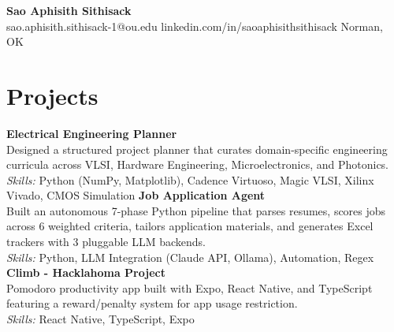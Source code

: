 \documentclass[11pt,letterpaper]{article}
\begin{document}
\begin{center}
{\LARGE \textbf{Sao Aphisith Sithisack}}\\[2pt]
\small sao.aphisith.sithisack-1@ou.edu \textbullet{} linkedin.com/in/saoaphisithsithisack \textbullet{} Norman, OK
\end{center}
\section*{Projects}
\noindent\textbf{Electrical Engineering Planner}\\
Designed a structured project planner that curates domain-specific engineering curricula across VLSI, Hardware Engineering, Microelectronics, and Photonics.\\
\textit{Skills:} Python (NumPy, Matplotlib), Cadence Virtuoso, Magic VLSI, Xilinx Vivado, CMOS Simulation
\noindent\textbf{Job Application Agent}\\
Built an autonomous 7-phase Python pipeline that parses resumes, scores jobs across 6 weighted criteria, tailors application materials, and generates Excel trackers with 3 pluggable LLM backends.\\
\textit{Skills:} Python, LLM Integration (Claude API, Ollama), Automation, Regex
\noindent\textbf{Climb - Hacklahoma Project}\\
Pomodoro productivity app built with Expo, React Native, and TypeScript featuring a reward/penalty system for app usage restriction.\\
\textit{Skills:} React Native, TypeScript, Expo
\end{document}
